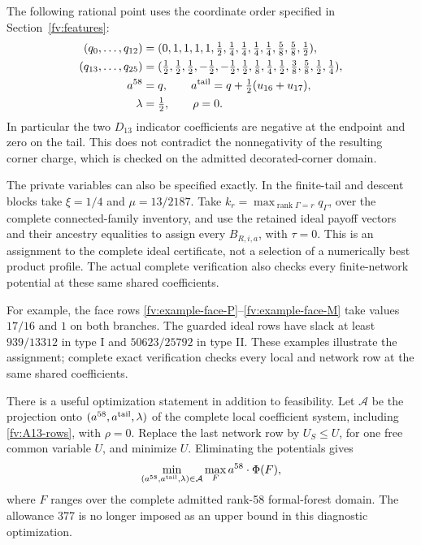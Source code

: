 The following rational point uses the coordinate order specified in
Section~\ref{fv:features}:
\begin{align}
 (q_0,\ldots,q_{12})={}&
 (0,1,1,1,1,\tfrac12,\tfrac14,\tfrac14,\tfrac14,\tfrac14,
       \tfrac58,\tfrac58,\tfrac12),\notag\\
 (q_{13},\ldots,q_{25})={}&
 (\tfrac12,\tfrac12,\tfrac12,-\tfrac12,-\tfrac12,\tfrac12,
       \tfrac18,\tfrac14,\tfrac12,\tfrac38,\tfrac58,\tfrac12,
       \tfrac14),\notag\\
 a^{58}={}&q,\qquad
 a^{\rm tail}=q+\tfrac12(u_{16}+u_{17}),\notag\\
 \lambda={}&\tfrac12,\qquad\rho=0.
 \label{fv:successful-law}
\end{align}
In particular the two $D_{13}$ indicator coefficients are negative at
the endpoint and zero on the tail. This does not contradict the
nonnegativity of the resulting corner charge, which is checked on
the admitted decorated-corner domain.

The private variables can also be specified exactly. In the finite-tail
and descent blocks take $\xi=1/4$ and $\mu=13/2187$. Take
$k_r=\max_{\operatorname{rank}\Gamma=r}q_\Gamma$, over the complete
connected-family inventory, and use the retained ideal payoff vectors
and their ancestry equalities to assign every $B_{R,i,a}$, with
$\tau=0$. This is an assignment to the complete ideal certificate,
not a selection of a numerically best product profile. The actual
complete verification also checks every finite-network potential at
these same shared coefficients.

For example, the face rows
\eqref{fv:example-face-P}--\eqref{fv:example-face-M} take values
$17/16$ and $1$ on both branches. The guarded ideal rows have slack
at least $939/13312$ in type I and $50623/25792$ in type II. These
examples illustrate the assignment; complete exact verification checks
every local and network row at the same shared coefficients.

There is a useful optimization statement in addition to feasibility.
Let $\mathcal A$ be the projection onto
$(a^{58},a^{\rm tail},\lambda)$ of the complete local coefficient
system, including \eqref{fv:A13-rows}, with $\rho=0$. Replace the
last network row by $U_S\le U$, for one free common variable $U$,
and minimize $U$. Eliminating the potentials gives
\begin{equation}\label{fv:minimax}
 \min_{(a^{58},a^{\rm tail},\lambda)\in\mathcal A}
                 \max_F a^{58}\cdot\Phi(F),
\end{equation}
where $F$ ranges over the complete admitted rank-58 formal-forest
domain. The allowance 377 is no longer imposed as an upper bound
in this diagnostic optimization.


